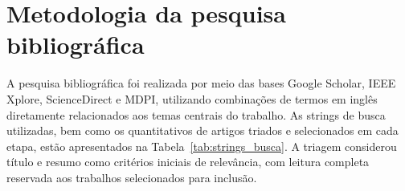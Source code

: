 \documentclass[
    12pt,                %
    openright,           %
    oneside,             %
    a4paper,             %
    english,             %
    brazil               %
]{abntex2}
\begin{document}
\section{Metodologia da pesquisa bibliográfica}
\label{sec:metodologia_pesquisa}

A pesquisa bibliográfica foi realizada por meio das bases Google Scholar, 
IEEE Xplore, ScienceDirect e MDPI, utilizando combinações de termos em 
inglês diretamente relacionados aos temas centrais do trabalho. As 
strings de busca utilizadas, bem como os quantitativos de artigos 
triados e selecionados em cada etapa, estão apresentados na 
Tabela~\ref{tab:strings_busca}. A triagem considerou título e resumo 
como critérios iniciais de relevância, com leitura completa reservada 
aos trabalhos selecionados para inclusão.
\end{document}
